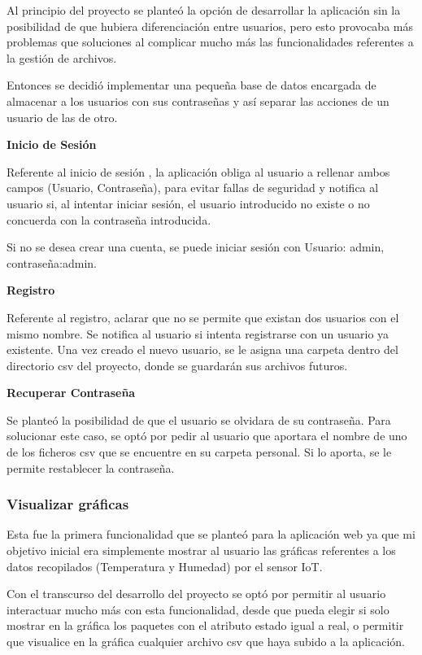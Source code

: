 Al principio del proyecto se planteó la opción de desarrollar la aplicación sin la posibilidad de que hubiera diferenciación entre usuarios, pero esto provocaba más problemas que soluciones al complicar mucho más las funcionalidades referentes a la gestión de archivos.

Entonces se decidió implementar una pequeña base de datos encargada de almacenar a los usuarios con sus contraseñas y así separar las acciones de un usuario de las de otro.


\textbf{Inicio de Sesión}

Referente al inicio de sesión , la aplicación obliga al usuario a rellenar ambos campos (Usuario, Contraseña), para evitar fallas de seguridad y notifica al usuario si, al intentar iniciar sesión, el usuario introducido no existe o no concuerda con la contraseña introducida.

Si no se desea crear una cuenta, se puede iniciar sesión con Usuario: admin, contraseña:admin.

\textbf{Registro}

Referente al registro, aclarar que no se permite que existan dos usuarios con el mismo nombre. Se notifica al usuario si intenta registrarse con un usuario ya existente. Una vez creado el nuevo usuario, se le asigna una carpeta dentro del directorio csv del proyecto, donde se guardarán sus archivos futuros.

\textbf{Recuperar Contraseña}

Se planteó la posibilidad de que el usuario se olvidara de su contraseña. Para solucionar este caso, se optó por pedir al usuario que aportara el nombre de uno de los ficheros csv que se encuentre en su carpeta personal. Si lo aporta, se le permite restablecer la contraseña.


\subsubsection{Visualizar gráficas}

Esta fue la primera funcionalidad que se planteó para la aplicación web ya que mi objetivo inicial era simplemente mostrar al usuario las gráficas referentes a los datos recopilados (Temperatura y Humedad) por el sensor IoT.

Con el transcurso del desarrollo del proyecto se optó por permitir al usuario interactuar mucho más con esta funcionalidad, desde que pueda elegir si solo mostrar en la gráfica los paquetes con el atributo estado igual a real, o permitir que visualice en la gráfica cualquier archivo csv que haya subido a la aplicación.

